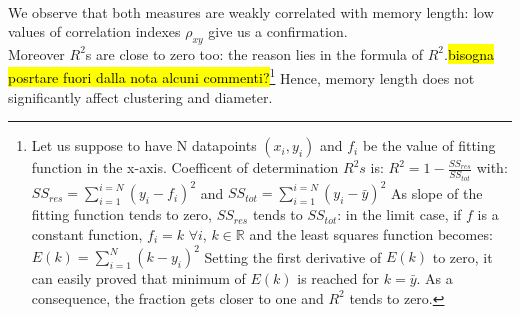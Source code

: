 \\
We observe that both measures are weakly correlated with
memory length: low values of correlation indexes
$\rho_{xy}$ give us a confirmation.\\
Moreover $R^2$s are close to zero too: the reason lies in the  formula
of $R^2$.\hl{bisogna posrtare fuori dalla nota alcuni commenti?}\footnote{Let us suppose to have N datapoints
$(x_i,y_i)$ and $f_i$ be the
value of fitting function in the x-axis. Coefficent of determination
$R^2s$ is: $R^{2}= 1-{\frac {SS_{ res}}  {SS_{ tot}}}$
with:
$SS_{ res}=\sum_{i=1}^{i=N}{(y_i - f_i)^2}$
and
$SS_{ tot}=\sum_{i=1}^{i=N}{(y_i - \bar{y})^2}$
As slope of the fitting function tends to zero, $SS_{res}$ tends
to $SS_{tot}$: in the limit case, if $f$ is a constant function,
$f_i=k$ $\forall  i$,  $k \in  \mathbb{R}$ and the least
squares function becomes: $E(k)= \sum_{i=1}^{N}{(k-y_i)^2} $
Setting the first derivative of $E(k)$ to zero, it can easily proved
that minimum of $E(k)$ is reached for $k=\bar{y}$.
As a consequence, the fraction gets closer to one and $R^2$ tends to zero.}
Hence, memory length does not significantly affect clustering and diameter.
